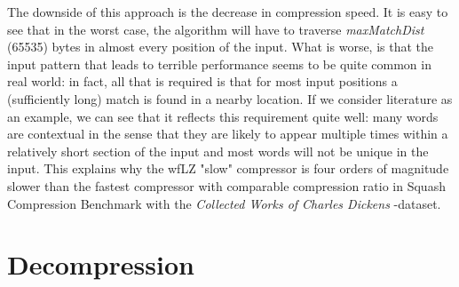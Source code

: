 \documentclass[english]{tktltiki2}
\theoremstyle{definition}
\theoremstyle{remark}
\begin{document}
The downside of this approach is the decrease in compression speed. It is easy to see that in the worst case, the algorithm will have to traverse \textit{maxMatchDist} (65535) bytes in almost every position of the input. What is worse, is that the input pattern that leads to terrible performance seems to be quite common in real world: in fact, all that is required is that for most input positions a (sufficiently long) match is found in a nearby location. If we consider literature as an example, we can see that it reflects this requirement quite well: many words are contextual in the sense that they are likely to appear multiple times within a relatively short section of the input and most words will not be unique in the input. This explains why the wfLZ "slow" compressor is four orders of magnitude slower than the fastest compressor with comparable compression ratio in Squash Compression Benchmark with the \textit{Collected Works of Charles Dickens} -dataset.

\section{Decompression}




%
%
% 
%

%
%




% 
\end{document}

